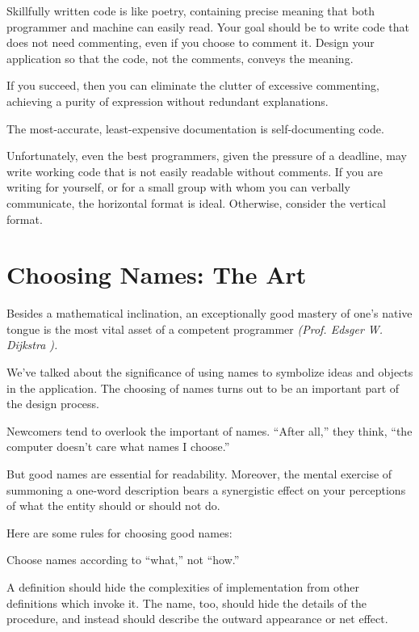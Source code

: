 Skillfully written \Forth{} code is like poetry, containing precise
meaning that both programmer and machine can easily read.  Your goal
should be to write code that does not need commenting, even if you
choose to comment it.  Design your application so that the code, not the
comments, conveys the meaning.

If you succeed, then you can eliminate the clutter of excessive
commenting, achieving a purity of expression without redundant
explanations.

\begin{tip}
The most-accurate, least-expensive documentation is self-documenting
code.
\end{tip}
Unfortunately, even the best programmers, given the pressure of a
deadline, may write working code that is not easily readable without comments.
If you are writing for yourself, or for a small group with whom
you can verbally communicate, the horizontal format is ideal.  Otherwise,
consider the vertical format.

\section{Choosing Names: The Art}

\begin{tfquot}
Besides a mathematical inclination, an exceptionally good mastery of one's
native tongue is the most vital asset of a competent programmer \emph{(Prof.
Edsger W. Dijkstra \cite{dijkstra82}).}
\end{tfquot}
We've talked about the significance of using names to symbolize ideas
and objects in the application.  The choosing of
names turns out to be an
important part of the design process.

Newcomers tend to overlook the important of names.  ``After all,''
they think, ``the computer doesn't care what names I choose.''

But good names are essential for readability.  Moreover, the mental
exercise of summoning a one-word description bears a synergistic effect
on your perceptions of what the entity should or should not do.

\smallbreak
Here are some rules for choosing good names:
\begin{tip}
Choose names according to ``what,'' not ``how.''
\end{tip}
A definition should hide the complexities of implementation from other
definitions which invoke it.  The name, too, should hide the details of the
procedure, and instead should describe the outward appearance or net
effect.

